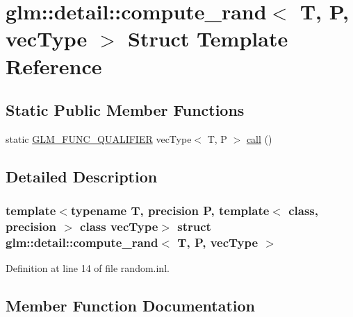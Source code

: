\hypertarget{structglm_1_1detail_1_1compute__rand}{}\section{glm\+::detail\+::compute\+\_\+rand$<$ T, P, vec\+Type $>$ Struct Template Reference}
\label{structglm_1_1detail_1_1compute__rand}
\subsection*{Static Public Member Functions}
\begin{DoxyCompactItemize}
\item 
static \mbox{\hyperlink{setup_8hpp_a33fdea6f91c5f834105f7415e2a64407}{G\+L\+M\+\_\+\+F\+U\+N\+C\+\_\+\+Q\+U\+A\+L\+I\+F\+I\+ER}} vec\+Type$<$ T, P $>$ \mbox{\hyperlink{structglm_1_1detail_1_1compute__rand_ab66bca4a567d6f4aa01031d669d270d3}{call}} ()
\end{DoxyCompactItemize}


\subsection{Detailed Description}
\subsubsection*{template$<$typename T, precision P, template$<$ class, precision $>$ class vec\+Type$>$\newline
struct glm\+::detail\+::compute\+\_\+rand$<$ T, P, vec\+Type $>$}



Definition at line 14 of file random.\+inl.



\subsection{Member Function Documentation}
\mbox{\label{structglm_1_1detail_1_1compute__rand_ab66bca4a567d6f4aa01031d669d270d3}} 
